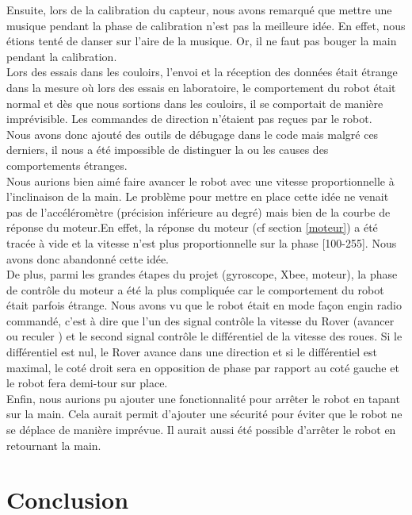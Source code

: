 {Ensuite, lors de la calibration du capteur, nous avons remarqué que mettre une musique pendant la phase de calibration n'est pas la meilleure idée. En effet, nous étions tenté de danser sur l'aire de la musique. Or, il ne faut pas bouger la main pendant la calibration.\\

Lors des essais dans les couloirs, l'envoi et la réception des données était étrange dans la mesure où lors des essais en laboratoire, le comportement du robot était normal et dès que nous sortions dans les couloirs, il se comportait de manière imprévisible. Les commandes de direction n'étaient pas reçues par le robot.\\
Nous avons donc ajouté des outils de débugage dans le code mais malgré ces derniers, il nous a été impossible de distinguer la ou les causes des comportements étranges.\\

Nous aurions bien aimé faire avancer le robot avec une vitesse proportionnelle à l'inclinaison de la main. Le problème pour mettre en place cette idée ne venait pas de l'accéléromètre (précision inférieure au degré) mais bien de la courbe de réponse du moteur.En effet, la réponse du moteur (cf section \ref{moteur}) a été tracée à vide et la vitesse n'est plus proportionnelle sur la phase [100-255]. Nous avons donc abandonné cette idée. \\
De plus, parmi les grandes étapes du projet (gyroscope, Xbee, moteur), la phase de contrôle du moteur a été la plus compliquée car le comportement du robot était parfois étrange. Nous avons vu que le robot était en mode  façon engin radio commandé, c'est à dire que l'un des signal contrôle la vitesse du Rover (avancer ou reculer ) et le second signal contrôle le différentiel de la vitesse des roues. Si le différentiel est nul, le Rover avance dans une direction et si le différentiel est maximal, le coté droit sera en opposition de phase par rapport au coté gauche et le robot fera demi-tour sur place.\\

Enfin, nous aurions pu ajouter une fonctionnalité pour arrêter le robot en tapant sur la main. Cela aurait permit d'ajouter une sécurité pour éviter que le robot ne se déplace de manière imprévue.
Il aurait aussi été possible d'arrêter le robot en retournant la main.




\chapter{Conclusion}

}
